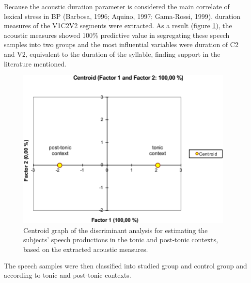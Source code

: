 Because the acoustic duration parameter is considered the main correlate of
lexical stress in BP (Barbosa, 1996; Aquino, 1997; Gama-Rossi, 1999), duration
measures of the V1C2V2 segments were extracted. As a result (figure \ref{gregio-fig01}), the
acoustic measures showed 100\% predictive value in segregating these speech
samples into two groups and the most influential variables were duration of C2
and V2, equivalent to the duration of the syllable, finding support in the
literature mentioned.

\begin{figure}
\centering
\includegraphics[width=0.7\linewidth]{imgs/gregio-image1.png}
\caption{Centroid graph of the discriminant analysis for estimating the subjects' speech productions in the tonic and post-tonic contexts, based on the extracted acoustic measures.} 
\label{gregio-fig01}
\end{figure}


The speech samples were then classified into studied group and control group
and according to tonic and post-tonic contexts.

